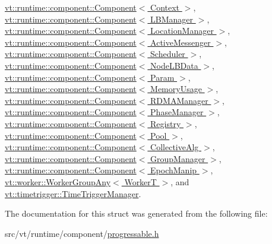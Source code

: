 \hyperlink{structvt_1_1runtime_1_1component_1_1_component_a45e3c09608c2d8d1a7de12e1c3347f1e}{vt\+::runtime\+::component\+::\+Component$<$ Context $>$}, \hyperlink{structvt_1_1runtime_1_1component_1_1_component_a45e3c09608c2d8d1a7de12e1c3347f1e}{vt\+::runtime\+::component\+::\+Component$<$ L\+B\+Manager $>$}, \hyperlink{structvt_1_1runtime_1_1component_1_1_component_a45e3c09608c2d8d1a7de12e1c3347f1e}{vt\+::runtime\+::component\+::\+Component$<$ Location\+Manager $>$}, \hyperlink{structvt_1_1runtime_1_1component_1_1_component_a45e3c09608c2d8d1a7de12e1c3347f1e}{vt\+::runtime\+::component\+::\+Component$<$ Active\+Messenger $>$}, \hyperlink{structvt_1_1runtime_1_1component_1_1_component_a45e3c09608c2d8d1a7de12e1c3347f1e}{vt\+::runtime\+::component\+::\+Component$<$ Scheduler $>$}, \hyperlink{structvt_1_1runtime_1_1component_1_1_component_a45e3c09608c2d8d1a7de12e1c3347f1e}{vt\+::runtime\+::component\+::\+Component$<$ Node\+L\+B\+Data $>$}, \hyperlink{structvt_1_1runtime_1_1component_1_1_component_a45e3c09608c2d8d1a7de12e1c3347f1e}{vt\+::runtime\+::component\+::\+Component$<$ Param $>$}, \hyperlink{structvt_1_1runtime_1_1component_1_1_component_a45e3c09608c2d8d1a7de12e1c3347f1e}{vt\+::runtime\+::component\+::\+Component$<$ Memory\+Usage $>$}, \hyperlink{structvt_1_1runtime_1_1component_1_1_component_a45e3c09608c2d8d1a7de12e1c3347f1e}{vt\+::runtime\+::component\+::\+Component$<$ R\+D\+M\+A\+Manager $>$}, \hyperlink{structvt_1_1runtime_1_1component_1_1_component_a45e3c09608c2d8d1a7de12e1c3347f1e}{vt\+::runtime\+::component\+::\+Component$<$ Phase\+Manager $>$}, \hyperlink{structvt_1_1runtime_1_1component_1_1_component_a45e3c09608c2d8d1a7de12e1c3347f1e}{vt\+::runtime\+::component\+::\+Component$<$ Registry $>$}, \hyperlink{structvt_1_1runtime_1_1component_1_1_component_a45e3c09608c2d8d1a7de12e1c3347f1e}{vt\+::runtime\+::component\+::\+Component$<$ Pool $>$}, \hyperlink{structvt_1_1runtime_1_1component_1_1_component_a45e3c09608c2d8d1a7de12e1c3347f1e}{vt\+::runtime\+::component\+::\+Component$<$ Collective\+Alg $>$}, \hyperlink{structvt_1_1runtime_1_1component_1_1_component_a45e3c09608c2d8d1a7de12e1c3347f1e}{vt\+::runtime\+::component\+::\+Component$<$ Group\+Manager $>$}, \hyperlink{structvt_1_1runtime_1_1component_1_1_component_a45e3c09608c2d8d1a7de12e1c3347f1e}{vt\+::runtime\+::component\+::\+Component$<$ Epoch\+Manip $>$}, \hyperlink{structvt_1_1worker_1_1_worker_group_any_a9b71b3e44ee938d873adce83d51dee33}{vt\+::worker\+::\+Worker\+Group\+Any$<$ Worker\+T $>$}, and \hyperlink{structvt_1_1timetrigger_1_1_time_trigger_manager_a15cc796e1f07dbf32c04b3fb3f3ce06c}{vt\+::timetrigger\+::\+Time\+Trigger\+Manager}.



The documentation for this struct was generated from the following file\+:\begin{DoxyCompactItemize}
\item 
src/vt/runtime/component/\hyperlink{progressable_8h}{progressable.\+h}\end{DoxyCompactItemize}
